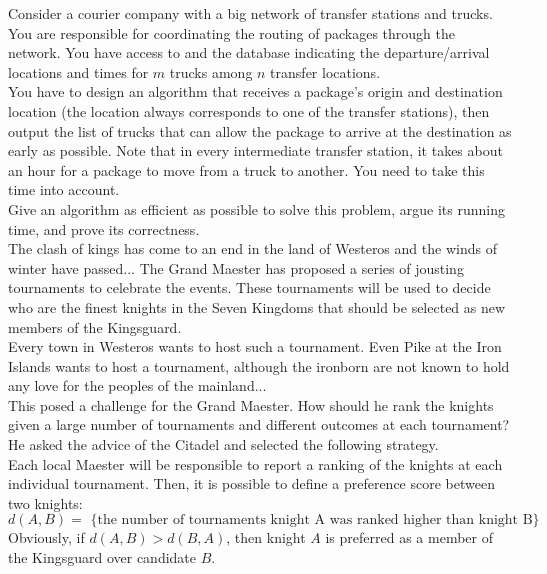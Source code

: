 \documentclass{article}
\begin{document}
 Consider a courier company with
a big network of transfer stations and trucks. You are responsible for
coordinating the routing of packages through the network. You have
access to and the database indicating the departure/arrival locations
and times for $m$ trucks among $n$ transfer locations.\\

\noindent You have to design an algorithm that receives a package's
origin and destination location (the location always corresponds to
one of the transfer stations), then output the list of trucks that can
allow the package to arrive at the destination as early as
possible. Note that in every intermediate transfer station, it takes
about an hour for a package to move from a truck to another. You need
to take this time into account.\\

\noindent Give an algorithm as efficient as possible to solve this
problem, argue its running time, and prove its correctness.\\

 The clash of kings has come to an end in
the land of Westeros and the winds of winter have passed... The Grand
Maester has proposed a series of jousting tournaments to celebrate the
events. These tournaments will be used to decide who are the finest
knights in the Seven Kingdoms that should be selected as new members
of the Kingsguard.\\

\noindent Every town in Westeros wants to host such a tournament. Even
Pike at the Iron Islands wants to host a tournament, although the
ironborn are not known to hold any love for the peoples of the
mainland...\\

\noindent This posed a challenge for the Grand Maester. How should he
rank the knights given a large number of tournaments and different
outcomes at each tournament? He asked the advice of the Citadel and
selected the following strategy.\\

\noindent Each local Maester will be responsible to report a ranking
of the knights at each individual tournament. Then, it is possible to
define a preference score between two knights:
$$d(A,B) = \textrm{ \{ the number of tournaments knight A was ranked
  higher than knight B\} }$$ Obviously, if $d(A,B) > d(B,A)$, then
knight $A$ is preferred as a member of the Kingsguard over candidate
$B$.\\
\end{document}
